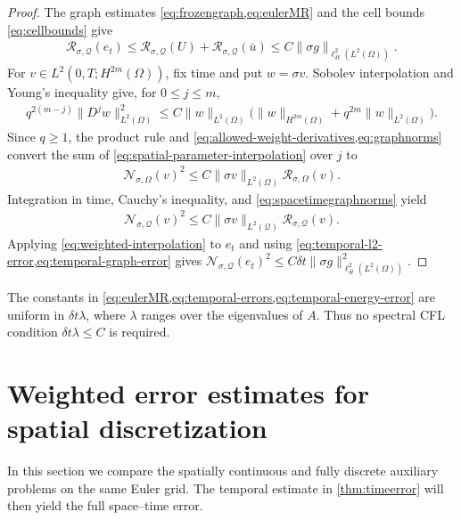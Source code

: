 \documentclass[print,wide,eng]{draft}
\begin{document}
\begin{proof}
The graph estimates \cref{eq:frozengraph,eq:eulerMR} and the cell bounds \cref{eq:cellbounds} give
%
\begin{align}
\mathcal R_{\sigma,\mathcal Q}(e_t)
\leq\mathcal R_{\sigma,\mathcal Q}(U)+\mathcal R_{\sigma,\mathcal Q}(\bar u)
\leq C\|\sigma g\|_{\ell_{\delta t}^2(L^2(\Omega))}.\label{eq:temporal-graph-error}
\end{align}
%
For $v\in L^2(0,T;H^{2m}(\Omega))$, fix time and put $w=\sigma v$. Sobolev interpolation and Young's inequality give, for $0\leq j\leq m$,
%
\begin{align}\label{eq:spatial-parameter-interpolation}
q^{2(m-j)}\|D^jw\|_{L^2(\Omega)}^2
\leq C\|w\|_{L^2(\Omega)}
\bigl(\|w\|_{H^{2m}(\Omega)}+q^{2m}\|w\|_{L^2(\Omega)}\bigr).
\end{align}
%
Since $q\geq1$, the product rule and \cref{eq:allowed-weight-derivatives,eq:graphnorms} convert the sum of \cref{eq:spatial-parameter-interpolation} over $j$ to
%
\begin{align*}
\mathcal N_{\sigma,\Omega}(v)^2\leq C\|\sigma v\|_{L^2(\Omega)}\mathcal R_{\sigma,\Omega}(v).
\end{align*}
%
Integration in time, Cauchy's inequality, and \cref{eq:spacetimegraphnorms} yield
%
\begin{align}\label{eq:weighted-interpolation}
\mathcal N_{\sigma,\mathcal Q}(v)^2
\leq C\|\sigma v\|_{L^2(\mathcal Q)}\mathcal R_{\sigma,\mathcal Q}(v).
\end{align}
%
Applying \cref{eq:weighted-interpolation} to $e_t$ and using \cref{eq:temporal-l2-error,eq:temporal-graph-error} gives
$\mathcal N_{\sigma,\mathcal Q}(e_t)^2\leq C{\delta t}\|\sigma g\|_{\ell_{\delta t}^2(L^2(\Omega))}^2$.
\end{proof}
%

\begin{remark}
The constants in \cref{eq:eulerMR,eq:temporal-errors,eq:temporal-energy-error} are uniform in ${\delta t}\lambda$, where $\lambda$ ranges over the eigenvalues of $A$. Thus no spectral CFL condition ${\delta t}\lambda\leq C$ is required.
\end{remark}

\section{Weighted error estimates for spatial discretization}\label{sec:error}

In this section we compare the spatially continuous and fully discrete auxiliary problems on the same Euler grid. The temporal estimate in \cref{thm:timeerror} will then yield the full space--time error.
\end{document}
